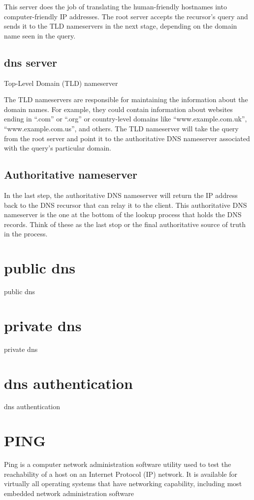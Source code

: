 \documentclass[a4paper,12pt]{article}
\begin{document}
This server does the job of translating the human-friendly hostnames into computer-friendly IP addresses. The root server accepts the recursor’s query and sends it to the TLD nameservers in the next stage, depending on the domain name seen in the query.

\subsection{dns server}

Top-Level Domain (TLD) nameserver

The TLD nameservers are responsible for maintaining the information about the domain names. For example, they could contain information about websites ending in “.com” or “.org” or country-level domains like “www.example.com.uk”, “www.example.com.us”, and others. The TLD nameserver will take the query from the root server and point it to the authoritative DNS nameserver associated with the query’s particular domain.

\subsection{Authoritative nameserver}

In the last step, the authoritative DNS nameserver will return the IP address back to the DNS recursor that can relay it to the client. This authoritative DNS nameserver is the one at the bottom of the lookup process that holds the DNS records. Think of these as the last stop or the final authoritative source of truth in the process.

\section{public dns}
public dns
\section{private dns}
private dns
\section{dns authentication}
dns authentication

\section{PING}
Ping is a computer network administration software utility used to test the reachability of a host on an Internet Protocol (IP) network. It is available for virtually all operating systems that have networking capability, including most embedded network administration software
\end{document}
